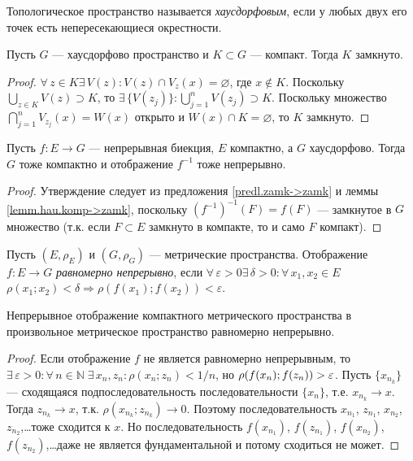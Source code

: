 \documentclass[10pt,titlepage, a4paper]{article}
\begin{document}
\begin{defen}
Топологическое пространство называется \emph{хаусдорфовым}, если у
любых двух его точек есть непересекающиеся окрестности.
\end{defen}

\begin{lemm}\label{lemm.hau.komp->zamk}
Пусть $G$ --- хаусдорфово пространство и $K\subset G$ --- компакт.
Тогда $K$ замкнуто.
\end{lemm}

\begin{proof}
$\forall\,z\in K$\;\;$\exists\,V(z):V(z)\cap V_z(x)=\varnothing$,
где $x\not\in K$. Поскольку $\bigcup\limits_{z\in K}V(z)\supset K$,
то $\exists\,\{V(z_j)\}:\bigcup\limits_{j=1}^n V(z_j)\supset K$.
Поскольку множество $\bigcap\limits_{j=1}^n V_{z_j}(x)=W(x)$ открыто
и $W(x)\cap K=\varnothing$, то $K$ замкнуто.
\end{proof}

\begin{predl}
Пусть $f\colon E\to G$ --- непрерывная биекция, $E$ компактно, а $G$
хаусдорфово. Тогда $G$ тоже компактно и отображение $f^{-1}$ тоже
непрерывно.
\end{predl}

\begin{proof}
Утверждение следует из предложения \ref{predl.zamk->zamk} и леммы
\ref{lemm.hau.komp->zamk}, поскольку $(f^{-1})^{-1}(F)=f(F)$ ---
замкнутое в $G$ множество (т.к. если $F\subset E$ замкнуто в
компакте, то и само $F$ компакт).
\end{proof}

\begin{defen}
Пусть $(E,\rho_E)$ и $(G,\rho_G)$ --- метрические пространства.
Отображение $f\colon E\to G$ \emph{равномерно непрерывно}, если
$\forall\,\varepsilon>0$\;\;$\exists\,\delta>0:\forall\, x_1,x_2\in
E$\;\;$\rho(x_1;x_2)<\delta\Rightarrow\rho(f(x_1);f(x_2))<\varepsilon$.
\end{defen}

\begin{predl}
Непрерывное отображение компактного метрического пространства в
произвольное метрическое пространство равномерно непрерывно.
\end{predl}

\begin{proof}
Если отображение $f$ не является равномерно непрерывным, то
$\exists\,\varepsilon>0:\forall\,n\in\mathbb{N}\;\exists\,x_n, z_n:
\rho(x_n;z_n)<1/n$, но $\rho(f(x_n);f(z_n))\p>\varepsilon$. Пусть
$\{x_{n_k}\}$ --- сходящаяся подпоследовательность
последовательности $\{x_n\}$, т.е. $x_{n_k}\to x$. Тогда $z_{n_k}\to
x$, т.к. $\rho(x_{n_k};z_{n_k})\to 0$. Поэтому последовательность
$x_{n_1}$, $z_{n_1}$, $x_{n_2}$, $z_{n_2}$,\ldots тоже сходится к
$x$. Но последовательность $f(x_{n_1})$, $f(z_{n_1})$, $f(x_{n_2})$,
$f(z_{n_2})$,\ldots даже не является фундаментальной и потому
сходиться не может.
\end{proof}
\end{document}
